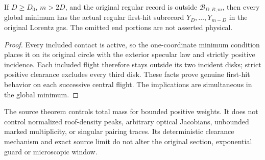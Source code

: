 \begin{corollary}
\label{cor:tb-central-physical}
If $D\ge D_0$, $m>2D$, and the original regular record is outside
$\mathcal B_{D,R,m}$, then every global minimum has the actual
regular first-hit subrecord $Y_D,\ldots,Y_{m-D}$ in the original
Lorentz gas.  The omitted end portions are not asserted physical.
\end{corollary}
\begin{proof}
Every included contact is active, so the one-coordinate minimum
condition places it on its original circle with the exterior
specular law and strictly positive incidence.  Each included flight
therefore stays outside its two incident disks; strict positive
clearance excludes every third disk.  These facts prove genuine
first-hit behavior on each successive central flight.  The
implications are simultaneous in the global minimum.
\end{proof}

The source theorem controls total mass for bounded positive weights.
It does not control normalized roof-density peaks, arbitrary optical
Jacobians, unbounded marked multiplicity, or singular pairing traces.
Its deterministic clearance mechanism and exact source limit do not
alter the original section, exponential guard or microscopic window.
